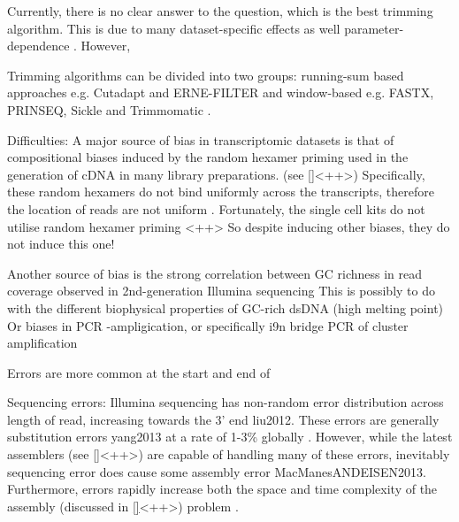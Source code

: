 

Currently, there is no clear answer to the question, which is the best trimming algorithm.
This is due to many dataset-specific effects as well parameter-dependence \citep{DelFabbro2013}.
However, 



Trimming algorithms can be divided into two groups: running-sum based approaches e.g. Cutadapt and ERNE-FILTER
and window-based e.g. FASTX, PRINSEQ, Sickle and Trimmomatic \citep{DelFabbro2013}.












Difficulties: 
A major source of bias in transcriptomic datasets is that of compositional biases induced
by the random hexamer priming used in the generation of cDNA in many library preparations.
(see \ref{}<++>) %
Specifically, these random hexamers do not bind uniformly across the transcripts,
therefore the location of reads are not uniform \citep{Hansen2010}\citep{Hansen2010}.
Fortunately, the single cell kits do not utilise random hexamer priming {}<++> %
So despite inducing other biases, they do not induce this one!


Another source of bias is the strong correlation between GC richness in read coverage
observed in 2nd-generation Illumina sequencing \citep{Dohm2008,}
This is possibly to do with the different biophysical properties of GC-rich dsDNA (high melting point) \citep{Dohm2008} %
Or biases in PCR -ampligication, or specifically i9n bridge PCR of cluster amplification


Errors are more common at the start and end of 




Sequencing errors: Illumina sequencing has non-random error distribution across length of read, increasing towards the 3' end liu2012. These errors are generally substitution errors yang2013 at a rate of 1-3\% globally \citep{MacManes2014}.  However, while the latest assemblers (see \ref{}<++>) are capable of %
handling many of these errors, inevitably sequencing error does cause some
assembly error MacManesANDEISEN2013.
Furthermore, errors rapidly increase both the space and time complexity of the assembly (discussed in \ref{}<++>) problem \citep{MacManes2014}.

